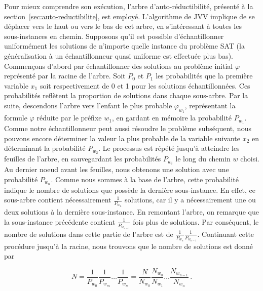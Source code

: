 Pour mieux comprendre son exécution, l'arbre d'auto-réductibilité, présenté à la section~\ref{sec:auto-reductibilite}, est employé. L'algorithme de JVV implique de se déplacer vers le haut ou vers le bas de cet arbre, en s'intéressant à toutes les sous-instances en chemin. Supposons qu'il est possible d'échantillonner uniformément les solutions de n'importe quelle instance du problème SAT (la généralisation à un échantillonneur quasi uniforme est effectuée plus bas). Commençons d'abord par échantillonner des solutions au problème initial $\varphi$ représenté par la racine de l'arbre. Soit $P_{0}$ et $P_{1}$ les probabilités que la première variable $x_{1}$ soit respectivement de 0 et 1 pour les solutions échantillonnées. Ces probabilités reflètent la proportion de solutions dans chaque sous-arbre. Par la suite, descendons l'arbre vers l'enfant le plus probable $\varphi_{w_{1}}$, représentant la formule $\varphi$ réduite par le préfixe $w_{1}$, en gardant en mémoire la probabilité $P_{w_{1}}$. Comme notre échantillonneur peut aussi résoudre le problème subséquent, nous pouvons encore déterminer la valeur la plus probable de la variable suivante $x_{2}$ en déterminant la probabilité $P_{w_{2}}$. Le processus est répété jusqu'à atteindre les feuilles de l'arbre, en sauvegardant les probabilités $P_{w_{i}}$ le long du chemin $w$ choisi. Au dernier noeud avant les feuilles, nous obtenons une solution avec une probabilité $P_{w_{n}}$. Comme nous sommes à la base de l'arbre, cette probabilité indique le nombre de solutions que possède la dernière sous-instance. En effet, ce sous-arbre contient nécessairement $\frac{1}{P_{w_{n}}}$ solutions, car il y a nécessairement une ou deux solutions à la dernière sous-instance. En remontant l'arbre, on remarque que la sous-instance précédente contient $\frac{1}{P_{w_{n-1}}}$ fois plus de solutions. Par conséquent, le nombre de solutions dans cette partie de l'arbre est de $\frac{1}{P_{w_{n}}} \frac{1}{P_{w_{n-1}}}$. Continuant cette procédure jusqu'à la racine, nous trouvons que le nombre de solutions est donné par 

\begin{equation}
    N = \frac{1}{P_{w_{0}}} \frac{1}{P_{w_{m}}} \dots \frac{1}{P_{w_{n}}} = \frac{N}{N_{w_{0}}} \frac{N_{w_{0}}}{N_{w_{1}}} \dots \frac{N_{w_{n-1}}}{N_{w_{n}}} \,.
\end{equation}

